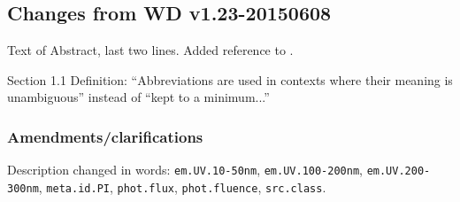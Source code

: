 \documentclass[11pt,a4paper]{ivoa}
\begin{document}
\subsection{Changes from WD v1.23-20150608}
Text of Abstract, last two lines. Added reference to \citet{tn:solar-system-ucd}.

Section 1.1 Definition: ``Abbreviations are used in contexts where their meaning is unambiguous'' instead of ``kept to a minimum...''

\subsubsection*{Amendments/clarifications}
\begin{flushleft}
Description changed in words: 
{\tt em.UV.10-50nm}, {\tt em.UV.100-200nm}, {\tt em.UV.200-300nm}, {\tt meta.id.PI}, 
{\tt phot.flux}, {\tt phot.fluence}, {\tt src.class}.
\end{flushleft}
\end{document}
